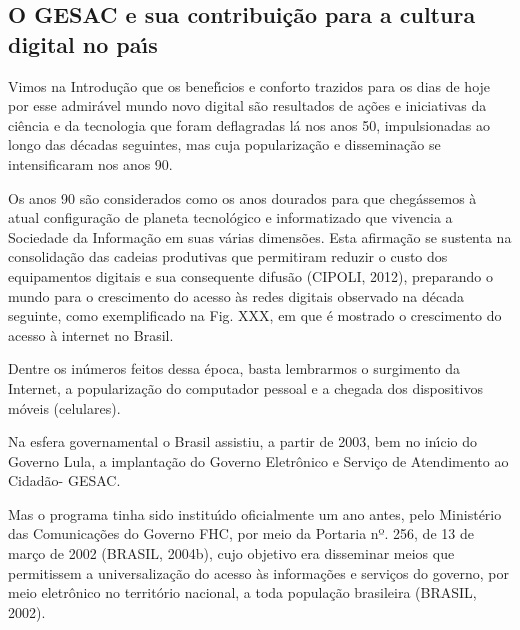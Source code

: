 \documentclass[
12pt,		%
openright,	%
twoside,  %
a4paper,			%
chapter=TITLE,		%
english,			%
french,				%
spanish,			%
brazil				%
]{USPSC-classe/USPSC}
\begin{document}
\subsection[O GESAC e sua contribui\c{c}\~ao para  a cultura  digital  no pa\'{\i}s]{O GESAC e sua contribui\c{c}\~ao para  a cultura  digital  no pa\'{\i}s}\label{O GESAC e sua contribui\c{c}\~ao para  a cultura  digital  no pa\'{\i}s}
Vimos na Introdu\c{c}\~ao que os benef\'{\i}cios e conforto trazidos para os dias de hoje por esse admir\'avel mundo novo digital s\~ao resultados de a\c{c}\~oes e iniciativas da ci\^encia e da tecnologia que foram deflagradas l\'a nos anos 50, impulsionadas ao longo das d\'ecadas seguintes, mas cuja populariza\c{c}\~ao e dissemina\c{c}\~ao se intensificaram nos anos 90.










Os anos 90 s\~ao considerados como os anos dourados para que cheg\'assemos \`a atual configura\c{c}\~ao de planeta tecnol\'ogico e informatizado que vivencia a Sociedade da Informa\c{c}\~ao em suas v\'arias dimens\~oes. Esta afirma\c{c}\~ao se sustenta na consolida\c{c}\~ao das cadeias produtivas que permitiram reduzir o custo dos equipamentos digitais e sua consequente difus\~ao  (CIPOLI, 2012), preparando o mundo para o crescimento do acesso \`as redes digitais observado na d\'ecada seguinte, como exemplificado na Fig. XXX, em que \'e mostrado o crescimento do acesso \`a internet no Brasil.










Dentre os  in\'umeros feitos dessa \'epoca, basta lembrarmos o surgimento da Internet, a populariza\c{c}\~ao do computador pessoal e a chegada dos dispositivos m\'oveis (celulares).










Na esfera governamental o Brasil assistiu, a partir de 2003, bem no in\'{\i}cio do Governo Lula, a implanta\c{c}\~ao do Governo Eletr\^onico e Servi\c{c}o de Atendimento ao Cidad\~ao-  GESAC.










Mas o programa tinha sido institu\'{\i}do oficialmente um ano antes, pelo Minist\'erio das Comunica\c{c}\~oes do Governo FHC, por meio  da Portaria nº. 256, de 13 de mar\c{c}o de 2002 (BRASIL, 2004b), cujo  objetivo era disseminar meios que permitissem a universaliza\c{c}\~ao do acesso \`as informa\c{c}\~oes e servi\c{c}os do governo, por meio eletr\^onico no territ\'orio nacional, a toda popula\c{c}\~ao brasileira (BRASIL, 2002).
\end{document}

